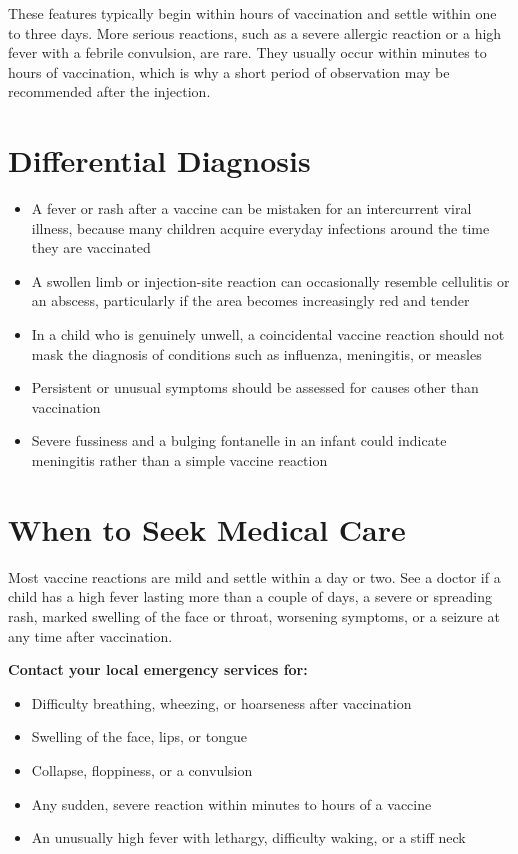 These features typically begin within hours of vaccination and settle within one to three days. More serious reactions, such as a severe allergic reaction or a high fever with a febrile convulsion, are rare. They usually occur within minutes to hours of vaccination, which is why a short period of observation may be recommended after the injection.

\section*{Differential Diagnosis}
\begin{itemize}
    \item A fever or rash after a vaccine can be mistaken for an intercurrent viral illness, because many children acquire everyday infections around the time they are vaccinated
    \item A swollen limb or injection-site reaction can occasionally resemble cellulitis or an abscess, particularly if the area becomes increasingly red and tender
    \item In a child who is genuinely unwell, a coincidental vaccine reaction should not mask the diagnosis of conditions such as influenza, meningitis, or measles
    \item Persistent or unusual symptoms should be assessed for causes other than vaccination
    \item Severe fussiness and a bulging fontanelle in an infant could indicate meningitis rather than a simple vaccine reaction
\end{itemize}

\section*{When to Seek Medical Care}
Most vaccine reactions are mild and settle within a day or two. See a doctor if a child has a high fever lasting more than a couple of days, a severe or spreading rash, marked swelling of the face or throat, worsening symptoms, or a seizure at any time after vaccination.

\textbf{Contact your local emergency services for:}
\begin{itemize}
    \item Difficulty breathing, wheezing, or hoarseness after vaccination
    \item Swelling of the face, lips, or tongue
    \item Collapse, floppiness, or a convulsion
    \item Any sudden, severe reaction within minutes to hours of a vaccine
    \item An unusually high fever with lethargy, difficulty waking, or a stiff neck
\end{itemize}

